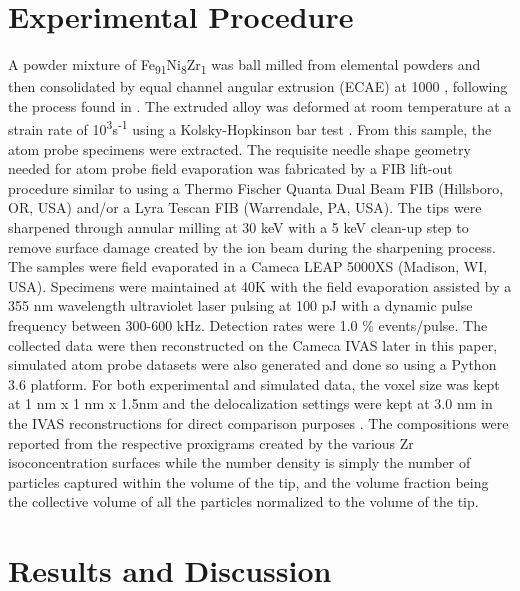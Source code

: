 \section*{Experimental Procedure}				
	A powder mixture of Fe\textsubscript{91}Ni\textsubscript{8}Zr\textsubscript{1} was ball milled from elemental powders and then consolidated by equal channel angular extrusion (ECAE) at 1000\celsius{} , following the process found in \cite{RN740}. The extruded alloy was deformed at room temperature at a strain rate of 10\textsuperscript{3}s\textsuperscript{-1} using a Kolsky-Hopkinson bar test \cite{RN896}. From this sample, the atom probe specimens were extracted. The requisite needle shape geometry needed for atom probe field evaporation was fabricated by a FIB lift-out procedure similar to \cite{RN347} using a Thermo Fischer Quanta Dual Beam FIB (Hillsboro, OR, USA)  and/or a Lyra Tescan FIB (Warrendale, PA, USA). The tips were sharpened through annular milling at 30 keV with a 5 keV clean-up step to remove surface damage created by the ion beam during the sharpening process. The samples were field evaporated in a Cameca LEAP 5000XS (Madison, WI, USA). Specimens were maintained at 40K with the field evaporation assisted by a 355 nm wavelength ultraviolet laser pulsing at 100 pJ with a dynamic pulse frequency between 300-600 kHz. Detection rates were 1.0 \% events/pulse. The collected data were then reconstructed on the Cameca IVAS later in this paper, simulated atom probe datasets were also generated and done so using a Python 3.6 platform. For both experimental and simulated data, the voxel size was kept at 1 nm x 1 nm x 1.5nm and the delocalization settings were kept at 3.0 nm in the IVAS reconstructions for direct comparison purposes \cite{RN210}. The compositions were reported from the respective proxigrams created by the various Zr isoconcentration surfaces while the number density is simply the number of particles captured within the volume of the tip, and the volume fraction being the collective volume of all the particles normalized to the volume of the tip. 

\section*{Results and Discussion}

